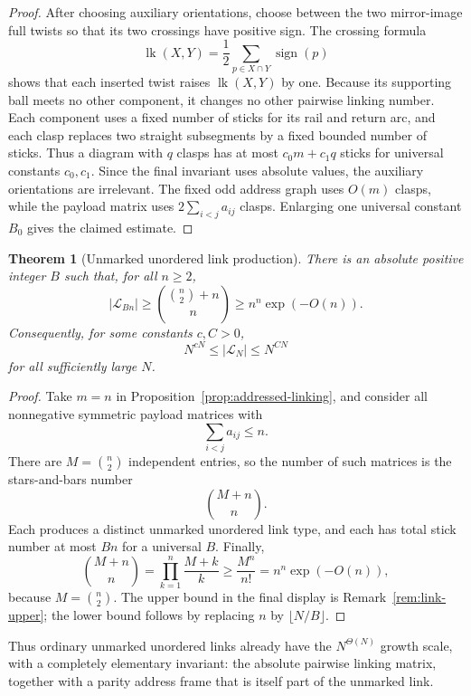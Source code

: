 \documentclass[11pt]{article}
\newtheorem{theorem}{Theorem}
\theoremstyle{remark}
\theoremstyle{plain}
\newcommand{\Lcal}{\mathcal{L}}
\begin{document}
\begin{proof}
After choosing auxiliary orientations, choose between the two mirror-image
full twists so that its two crossings have positive sign.  The crossing
formula
\[
    \operatorname{lk}(X,Y)
    =\frac12\sum_{p\in X\cap Y}\operatorname{sign}(p)
\]
shows that each inserted twist raises \(\operatorname{lk}(X,Y)\) by one.
Because its supporting ball meets no other component, it changes no other
pairwise linking number.  Each component uses a fixed number of sticks for its
rail and return arc, and each clasp replaces two straight subsegments by a
fixed bounded number of sticks.  Thus a diagram
with \(q\) clasps has at most \(c_0m+c_1q\) sticks for universal constants
\(c_0,c_1\).  Since the final invariant uses absolute values, the auxiliary
orientations are irrelevant.  The fixed odd address graph uses \(O(m)\)
clasps, while the payload matrix uses
\(2\sum_{i<j}a_{ij}\) clasps.  Enlarging one universal constant \(B_0\) gives
the claimed estimate.
\end{proof}

\begin{theorem}[Unmarked unordered link production]\label{thm:link-lower}
There is an absolute positive integer \(B\) such that, for all \(n\ge2\),
\[
    |\Lcal_{Bn}|
    \ge
    \binom{\binom n2+n}{n}
    \ge
    n^n\exp(-O(n)).
\]
Consequently, for some constants \(c,C>0\),
\[
    N^{cN}\le |\Lcal_N|\le N^{CN}
\]
for all sufficiently large \(N\).
\end{theorem}

\begin{proof}
Take \(m=n\) in Proposition~\ref{prop:addressed-linking}, and consider all
nonnegative symmetric payload matrices with
\[
    \sum_{i<j}a_{ij}\le n.
\]
There are \(M=\binom n2\) independent entries, so the number of such matrices is
the stars-and-bars number
\[
    \binom{M+n}{n}.
\]
Each produces a distinct unmarked unordered link type, and each has total stick
number at most \(B n\) for a universal \(B\).  Finally,
\[
    \binom{M+n}{n}
    =
    \prod_{k=1}^n \frac{M+k}{k}
    \ge
    \frac{M^n}{n!}
    =
    n^n\exp(-O(n)),
\]
because \(M=\binom n2\).  The upper bound in the final display is
Remark~\ref{rem:link-upper}; the lower bound follows by replacing \(n\) by
\(\lfloor N/B\rfloor\).
\end{proof}

Thus ordinary unmarked unordered links already have the \(N^{\Theta(N)}\)
growth scale, with a completely elementary invariant: the absolute pairwise
linking matrix, together with a parity address frame that is itself part of the
unmarked link.
\end{document}
